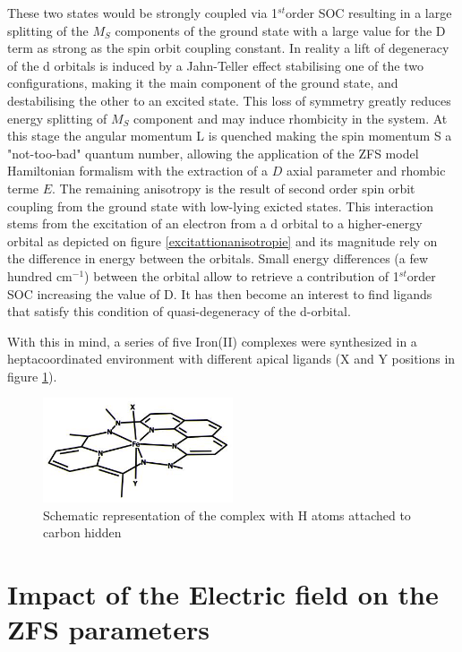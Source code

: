\documentclass[10pt]{report}
\numberwithin{equation}{section}
\begin{document}
These two states would be strongly coupled via 1$^{st}$order SOC resulting in a large splitting of the $M_S$ components of the ground state with a large value for the D term as strong as the spin orbit coupling constant.
In reality a lift of degeneracy of the d orbitals is induced by a Jahn-Teller effect stabilising one of the two configurations, making it the main component of the ground state, and destabilising the other to an excited state.
This loss of symmetry greatly reduces energy splitting of $M_S$ component and may induce rhombicity in the system. 
At this stage the angular momentum L is quenched making the spin momentum S a "not-too-bad" quantum number, allowing the application of the ZFS model Hamiltonian formalism with the extraction of a $D$ axial parameter and rhombic terme $E$.
The remaining anisotropy is the result of second order spin orbit coupling from the ground state with low-lying exicted states.
This interaction stems from the excitation of an electron from a d orbital to a higher-energy orbital as depicted on figure \ref{excitattionanisotropie} and its magnitude rely on the difference in energy between the orbitals.
Small energy differences (a few hundred cm$^{-1}$) between the orbital allow to retrieve a contribution of 1$^{st}$order SOC increasing the value of D.
It has then become an interest to find ligands that satisfy this condition of quasi-degeneracy of the d-orbital.

With this in mind, a series of five Iron(II) complexes were synthesized in a heptacoordinated environment with different apical ligands (X and Y positions in figure \ref{FeComplex}).

\begin{figure}[h!]
    \centering
    \includegraphics[width=0.5\textwidth]{Images/ComplexFe.XY.jpg}
    \caption{Schematic representation of the complex with H atoms attached to carbon hidden}
    \label{FeComplex}
\end{figure}


\newpage

\section{Impact of the Electric field on the ZFS parameters}
\end{document}
